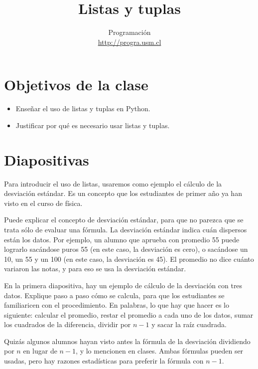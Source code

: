 \documentclass[10pt]{article}
\title{Listas y tuplas}
\author{Programación \\ \url{http://progra.usm.cl}}
\date{}
\begin{document}
  \maketitle

  \section*{Objetivos de la clase}
  \begin{itemize}
    \item Enseñar el uso de listas y tuplas en Python.
    \item Justificar por qué es necesario
      usar listas y tuplas.
  \end{itemize}

  \section*{Diapositivas}


  Para introducir el uso de listas,
  usaremos como ejemplo el cálculo de la desviación estándar.
  Es un concepto que los estudiantes de primer año
  ya han visto en el curso de física.

  Puede explicar el concepto de desviación estándar,
  para que no parezca que se trata sólo de evaluar una fórmula.
  La desviación estándar indica cuán dispersos están los datos.
  Por ejemplo,
  un alumno que aprueba con promedio 55 puede lograrlo
  sacándose puros 55 (en este caso, la desviación es cero),
  o sacándose un 10, un 55 y un 100 (en este caso, la desviación es 45).
  El promedio no dice cuánto variaron las notas,
  y para eso se usa la desviación estándar.

  En la primera diapositiva,
  hay un ejemplo de cálculo de la desviación
  con tres datos.
  Explique paso a paso cómo se calcula,
  para que los estudiantes se familiaricen con el procedimiento.
  En palabras,
  lo que hay que hacer es lo siguiente:
  calcular el promedio,
  restar el promedio a cada uno de los datos,
  sumar los cuadrados de la diferencia,
  dividir por \(n - 1\) y sacar la raíz cuadrada.

  Quizás algunos alumnos hayan visto antes
  la fórmula de la desviación dividiendo por \(n\) en lugar de \(n - 1\),
  y lo mencionen en clases.
  Ambas fórmulas pueden ser usadas,
  pero hay razones estadísticas para preferir la fórmula con \(n - 1\).

\end{document}
